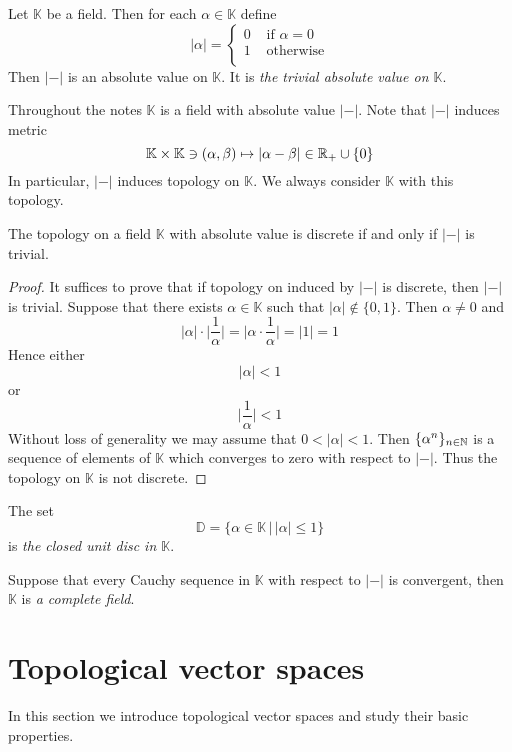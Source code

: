 \begin{example}\label{example:trivial_absolute_value}
Let $\mathbb{K}$ be a field. Then for each $\alpha \in \mathbb{K}$ define
$$|\alpha| = \begin{cases}
0&\mbox{ if }\alpha = 0\\
1&\mbox{ otherwise}\\
\end{cases}$$
Then $|-|$ is an absolute value on $\mathbb{K}$. It is \textit{the trivial absolute value on $\mathbb{K}$}.
\end{example}
\noindent
Throughout the notes $\mathbb{K}$ is a field with absolute value $|-|$. Note that $|-|$ induces metric 
$$\mathbb{K}\times \mathbb{K} \ni \left(\alpha, \beta\right) \mapsto |\alpha - \beta|\in {\mathbb R}_+\cup \{0\}$$
In particular, $|-|$ induces topology on $\mathbb{K}$. We always consider $\mathbb{K}$ with this topology.

\begin{fact}\label{fact:trivial_absolute_value_is_the_same_as_discrete_topology}
The topology on a field $\mathbb{K}$ with absolute value is discrete if and only if $|-|$ is trivial.
\end{fact}
\begin{proof}
It suffices to prove that if topology on induced by $|-|$ is discrete, then $|-|$ is trivial. Suppose that there exists $\alpha \in \mathbb{K}$ such that $|\alpha| \not \in \{0,1\}$. Then $\alpha \neq 0$ and 
$$|\alpha|\cdot \bigg|\frac{1}{\alpha}\bigg| = \bigg|\alpha \cdot \frac{1}{\alpha}\bigg| = |1| = 1$$
Hence either 
$$|\alpha| < 1$$ 
or
$$\bigg|\frac{1}{\alpha}\bigg| < 1$$
Without loss of generality we may assume that $0 < |\alpha| < 1$. Then $\{\alpha^n\}_{n\in {\mathbb N}}$ is a sequence of elements of $\mathbb{K}$ which converges to zero with respect to $|-|$. Thus the topology on $\mathbb{K}$ is not discrete.
\end{proof}

\begin{definition}
The set
$$\mathbb{D} = \big\{\alpha \in \mathbb{K}\,\big|\,|\alpha| \leq 1\big\}$$
is \textit{the closed unit disc in $\mathbb{K}$}.
\end{definition}

\begin{definition}
Suppose that every Cauchy sequence in $\mathbb{K}$ with respect to $|-|$ is convergent, then $\mathbb{K}$ is \textit{a complete field}.   
\end{definition}

\section{Topological vector spaces}
\noindent
In this section we introduce topological vector spaces and study their basic properties.

